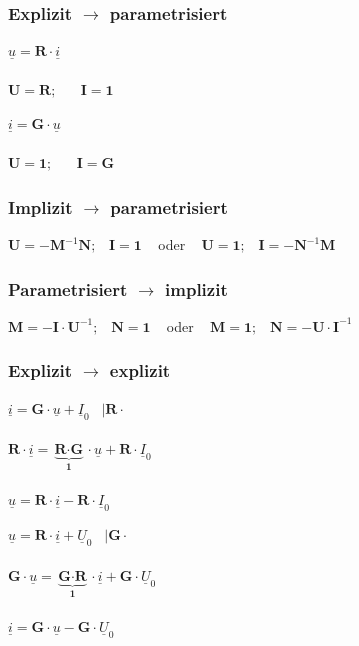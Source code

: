 \documentclass[a4paper,twocolumn,10pt]{article}
\begin{document}
\subsubsection*{Explizit $\rightarrow$ parametrisiert}
\begin{minipage}[b]{0.23\textwidth}
$\underline{u}=\textbf{R}\cdot \underline{i}$\\\\
$\textbf{U}=\textbf{R};\;\;\;\;\;\;\textbf{I}=\textbf{1}$
\end{minipage}
\hfill
\begin{minipage}[b]{0.23\textwidth}
$\underline{i}=\textbf{G}\cdot \underline{u}$\\\\
$\textbf{U}=\textbf{1};\;\;\;\;\;\;\textbf{I}=\textbf{G}$
\end{minipage}

\subsubsection*{Implizit $\rightarrow$ parametrisiert}
$\textbf{U}=-\textbf{M}^{-1}\textbf{N};\;\;\; \textbf{I}=\textbf{1}\;\;\;$ oder $\;\;\;\textbf{U}=\textbf{1};\;\;\; \textbf{I}=-\textbf{N}^{-1}\textbf{M}$

\subsubsection*{Parametrisiert $\rightarrow$ implizit}
$\textbf{M}=-\textbf{I}\cdot\textbf{U}^{-1};\;\;\; \textbf{N}=\textbf{1}\;\;\;$ oder $\;\;\;\textbf{M}=\textbf{1};\;\;\; \textbf{N}=-\textbf{U}\cdot\textbf{I}^{-1}$

\subsubsection*{Explizit $\rightarrow$ explizit}
\begin{minipage}[b]{0.23\textwidth}
$\underline{i}=\textbf{G}\cdot \underline{u}+\underline{I}_0\;\;\;|\textbf{R}\cdot$\\\\
$\textbf{R}\cdot \underline{i}=\underbrace{\textbf{R}\cdot\textbf{G}}_{\textbf{1}}\cdot \underline{u}+\textbf{R}\cdot\underline{I}_0$\\\\
$\underline{u}=\textbf{R}\cdot\underline{i}-\textbf{R}\cdot\underline{I}_0$
\end{minipage}
\hfill
\begin{minipage}[b]{0.23\textwidth}
$\underline{u}=\textbf{R}\cdot \underline{i}+\underline{U}_0\;\;\;|\textbf{G}\cdot$\\\\
$\textbf{G}\cdot \underline{u}=\underbrace{\textbf{G}\cdot\textbf{R}}_{\textbf{1}}\cdot \underline{i}+\textbf{G}\cdot\underline{U}_0$\\\\
$\underline{i}=\textbf{G}\cdot\underline{u}-\textbf{G}\cdot\underline{U}_0$
\end{minipage}\\\\
\end{document}
